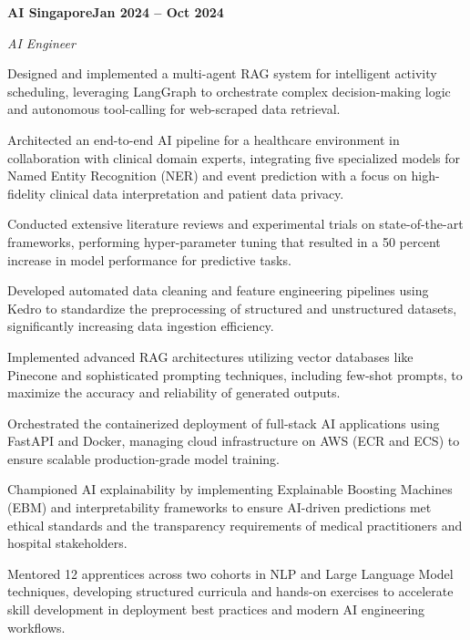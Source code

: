 \documentclass[letterpaper,10pt]{article}
\newcommand{\headingBf}[2]{\par\noindent\hspace*{10pt}\textbf{#1}\hfill\textbf{#2}}
\newcommand{\headingIt}[2]{\par\noindent\hspace*{10pt}\textit{#1}\hfill\textit{#2}}
\newenvironment{resume_list}{\vspace{-7pt}\begin{itemize}[itemsep=-2px, parsep=1pt, leftmargin=30pt]}{\end{itemize}}
\begin{document}
  \headingBf{AI Singapore}{Jan 2024 -- Oct 2024}
  \headingIt{AI Engineer}{}
  \begin{resume_list}
    \item Designed and implemented a multi-agent RAG system for intelligent activity scheduling, leveraging LangGraph to orchestrate complex decision-making logic and autonomous tool-calling for web-scraped data retrieval.
    \item Architected an end-to-end AI pipeline for a healthcare environment in collaboration with clinical domain experts, integrating five specialized models for Named Entity Recognition (NER) and event prediction with a focus on high-fidelity clinical data interpretation and patient data privacy.
    \item Conducted extensive literature reviews and experimental trials on state-of-the-art frameworks, performing hyper-parameter tuning that resulted in a 50 percent increase in model performance for predictive tasks.
    \item Developed automated data cleaning and feature engineering pipelines using Kedro to standardize the preprocessing of structured and unstructured datasets, significantly increasing data ingestion efficiency.
    \item Implemented advanced RAG architectures utilizing vector databases like Pinecone and sophisticated prompting techniques, including few-shot prompts, to maximize the accuracy and reliability of generated outputs.
    \item Orchestrated the containerized deployment of full-stack AI applications using FastAPI and Docker, managing cloud infrastructure on AWS (ECR and ECS) to ensure scalable production-grade model training.
    \item Championed AI explainability by implementing Explainable Boosting Machines (EBM) and interpretability frameworks to ensure AI-driven predictions met ethical standards and the transparency requirements of medical practitioners and hospital stakeholders.
    \item Mentored 12 apprentices across two cohorts in NLP and Large Language Model techniques, developing structured curricula and hands-on exercises to accelerate skill development in deployment best practices and modern AI engineering workflows.
  \end{resume_list}
\end{document}
